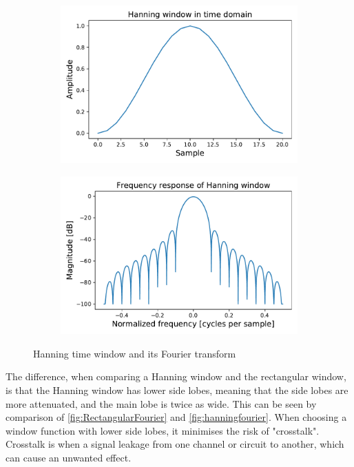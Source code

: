 \begin{figure}[H]
    \centering
    \begin{subfigure}[b]{.49\textwidth}
        \centering
        \includegraphics[width=\textwidth]{figures/HanningTime.pdf}
        \caption{}
        \label{fig:hanningtime}
    \end{subfigure}
    \begin{subfigure}[b]{.49\textwidth}
        \centering
        \includegraphics[width=\textwidth]{figures/HanningFourier.pdf}
        \caption{}
        \label{fig:hanningfourier}
    \end{subfigure}
\caption{Hanning time window and its Fourier transform}
\label{fig: Hanning}
\end{figure}
The difference, when comparing a Hanning window and the rectangular window, is that the Hanning window has lower side lobes, meaning that the side lobes are more attenuated, and the main lobe is twice as wide. This can be seen by comparison of \autoref{fig:RectangularFourier} and \autoref{fig:hanningfourier}. When choosing a window function with lower side lobes, it minimises the risk of "crosstalk". Crosstalk is when a signal leakage from one channel or circuit to another, which can cause an unwanted effect. \\

